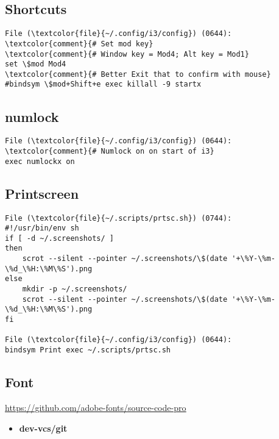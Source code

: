 \documentclass[10pt, a4paper, onecolumn, openany]{book}         %
\begin{document}
\subsection{Shortcuts}
\begin{Verbatim}[commandchars=\\\{\}]
File (\textcolor{file}{~/.config/i3/config}) (0644):
\textcolor{comment}{# Set mod key}
\textcolor{comment}{# Window key = Mod4; Alt key = Mod1}
set \$mod Mod4
\textcolor{comment}{# Better Exit that to confirm with mouse}
#bindsym \$mod+Shift+e exec killall -9 startx
\end{Verbatim}

\subsection{numlock}
\begin{Verbatim}[commandchars=\\\{\}]
File (\textcolor{file}{~/.config/i3/config}) (0644):
\textcolor{comment}{# Numlock on on start of i3}
exec numlockx on
\end{Verbatim}





\subsection{Printscreen}
\begin{Verbatim}[commandchars=\\\{\}]
File (\textcolor{file}{~/.scripts/prtsc.sh}) (0744):
#!/usr/bin/env sh
if [ -d ~/.screenshots/ ]
then
    scrot --silent --pointer ~/.screenshots/\$(date '+\%Y-\%m-\%d_\%H:\%M\%S').png
else
    mkdir -p ~/.screenshots/
    scrot --silent --pointer ~/.screenshots/\$(date '+\%Y-\%m-\%d_\%H:\%M\%S').png
fi

File (\textcolor{file}{~/.config/i3/config}) (0644):
bindsym Print exec ~/.scripts/prtsc.sh
\end{Verbatim}



\subsection{Font}
\underline{\url{https://github.com/adobe-fonts/source-code-pro}}

\begin{itemize}
    \item \textbf{dev-vcs/git}
\end{itemize}
\end{document}
